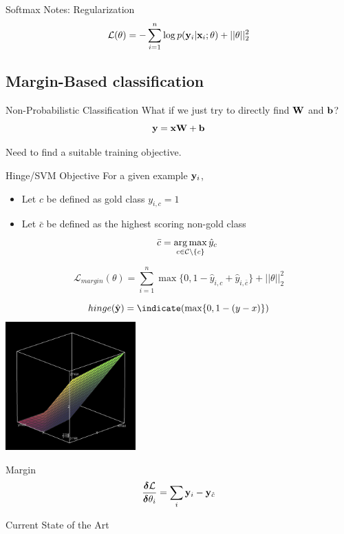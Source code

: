 \documentclass{beamer}
\begin{document}
\begin{frame}{Softmax Notes: Regularization}
  \[ \mathcal{L}(\theta) = - \sum_{i=1}^n \log p(\mathbf{y}_i | \mathbf{x}_i; \theta) + ||\theta||^2_2\] 


\end{frame}

\subsection{Margin-Based classification}


\begin{frame}{Non-Probabilistic Classification}
  What if we just try to directly find $\mathbf{W}$ and $\mathbf{b}$? 
     \[\mathbf{y} = \mathbf{x} \mathbf{W} + \mathbf{b}\]   

  Need to find a suitable training objective.
\end{frame}


\begin{frame}{Hinge/SVM Objective}
  For a given example $\mathbf{y}_i$,

  \begin{itemize}
  \item   Let $c$ be defined as gold class $y_{i, c} = 1$  
  \item   Let $\bar{c}$ be defined as the highest scoring non-gold class 
    \[\bar{c} = \argmax_{c \in \mcC \setminus\{c\}} \hat{y}_c \] 

  \end{itemize}


    \[ \mathcal{L}_{margin}(\theta) = \sum_{i=1}^n \max\{0, 1 - \hat{y}_{i, c} + \hat{y}_{i, \bar{c}}\}  + ||\theta||^2_2 \]
\end{frame}


\begin{frame}
  \[hinge(\hat{\boldy}) = \indicate(\max\{0, 1 - (y - x)\}) \]
  \includegraphics[width=5cm]{hinge}                                  
\end{frame}  

\begin{frame}{Margin}
  \[\frac{\boldsymbol{\delta} \mathcal{L}}{\boldsymbol{\delta} \theta_i} = \sum_i \mathbf{y}_i - \mathbf{y}_{\hat{c}}  \]
\end{frame}



\begin{frame}{Current State of the Art} 
  
\end{frame}
\end{document}
